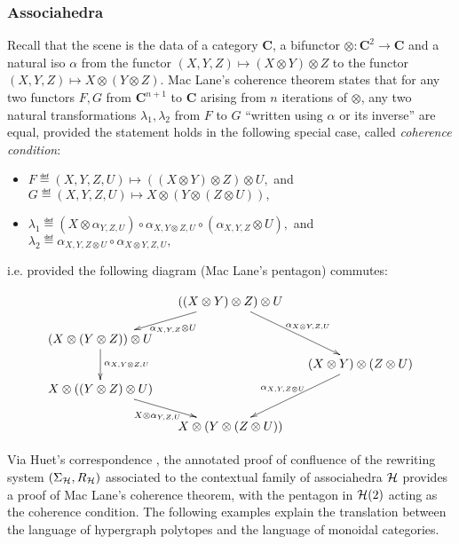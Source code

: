 \subsubsection{Associahedra}
Recall that the scene is the data of a category $\mathbf C$, a bifunctor $\otimes:\mathbf{C}^2\rightarrow \mathbf C$ and a natural iso $\alpha$ from the functor
$(X,Y,Z)\mapsto (X\otimes Y)\otimes Z$ to the functor  $(X,Y,Z)\mapsto X \otimes (Y\otimes Z)$. 
Mac Lane's coherence theorem states that for any two functors $F,G$ from $\mathbf{C}^{n+1}$ to $\mathbf{C}$ arising from $n$ iterations of $\otimes$, any two  natural transformations $\lambda_1,\lambda_2$ from $F$ to $G$  ``written using $\alpha$ or its inverse'' are equal, provided the statement holds in the following special case, called  {\em coherence condition}: 
\begin{itemize}
\item $F\eqdef (X,Y,Z,U)\mapsto ((X\otimes Y)\otimes Z)\otimes U,$ and $G\eqdef (X,Y,Z,U)\mapsto X\otimes (Y\otimes (Z\otimes U)),$ 
\item $\lambda_1\eqdef (X\otimes\alpha_{Y,Z,U})\circ\alpha_{X,Y\otimes Z,U} \circ (\alpha_{X,Y,Z}\otimes U),$ and $\lambda_2\eqdef  \alpha_{X,Y,Z\otimes U}\circ \alpha_{X\otimes Y,Z,U},$ 
\end{itemize}
i.e. provided the following diagram (Mac Lane's pentagon) commutes:
\begin{center}
\vspace{-.5cm}
$$
 \xymatrix @-1.65pc {&& ((X\otimes Y)\otimes Z)\otimes U \ar @{->}[ddll]^{\alpha_{X,Y,Z}\otimes U} \ar @{->}[dddrr]^{\alpha_{X\otimes Y,Z,U}}&& \\
 &&&&\\
 (X\otimes (Y\otimes Z))\otimes U  \ar @{->}[dd]^{\alpha_{X,Y\otimes Z,U} }&&   && \\
 &&&&(X\otimes Y)\otimes (Z\otimes U) \ar @{->}[dddll]_{\alpha_{X,Y,Z\otimes U}}\\
 X\otimes ((Y\otimes Z)\otimes U) \ar @{->}[ddrr]_{X\otimes\alpha_{Y,Z,U}} &  &\\
 &&&&\\
 &&X\otimes (Y\otimes (Z\otimes U))&&}
$$
\end{center}

Via Huet's correspondence \cite{Huet-notes-cat}, the annotated proof of confluence of the rewriting system $(\Sigma_{\mathcal{H}}, R_{\mathcal{H}})$ associated to the contextual family of associahedra $\mathcal{H}$ provides a proof of Mac Lane's coherence theorem, with the pentagon in $\mathcal{H}(2)$ acting as the coherence condition. 
The following examples explain the translation between the language of hypergraph polytopes and the language of monoidal categories. 

